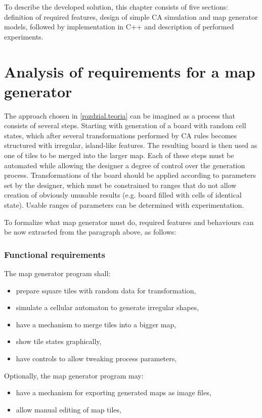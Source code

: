 \documentclass[12pt]{report}
\begin{document}
To describe the developed solution, this chapter consists of five sections: definition of required features, design of simple CA simulation and map generator models, followed by implementation in C++ and description of performed experiments. 

\section{Analysis of requirements for a map generator}

The approach chosen in \cref{rozdzial.teoria} can be imagined as a process that consists of several steps. Starting with generation of a board with random cell states, which after several transformations performed by CA rules becomes structured with irregular, island-like features. The resulting board is then used as one of tiles to be merged into the larger map. Each of these steps must be automated while allowing the designer a degree of control over the generation process. Transformations of the board should be applied according to parameters set by the designer, which must be constrained to ranges that do not allow creation of obviously unusable results (e.g. board filled with cells of identical state). Usable ranges of parameters can be determined with experimentation.

To formalize what map generator must do, required features and behaviours can be now extracted from the paragraph above, as follows:
 
\subsubsection{Functional requirements}

The map generator program shall:
\begin{itemize}
	\item prepare square tiles with random data for transformation,
	\item simulate a cellular automaton to generate irregular shapes,
	\item have a mechanism to merge tiles into a bigger map,
	\item show tile states graphically,
	\item have controls to allow tweaking process parameters,
\end{itemize}

Optionally, the map generator program may:
\begin{itemize}
	\item have a mechanism for exporting generated maps as image files,
	\item allow manual editing of map tiles, 
\end{itemize}
\end{document}
